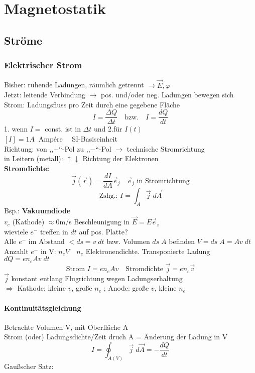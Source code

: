 \documentclass[titlepage,12pt,a4paper,ngerman]{report}
\newcommand{\tx}[1]{\textrm{#1}}
\begin{document}
\chapter{Magnetostatik}
\setcounter{section}{5}
\section{Ströme}
\subsection{Elektrischer Strom}
Bisher: ruhende Ladungen, räumlich getrennt $\rightarrow \vec{E}, \varphi$\\
Jetzt: leitende Verbindung $\rightarrow$ pos. und/oder neg. Ladungen bewegen sich\\
Strom: Ladungsfluss pro Zeit durch eine gegebene Fläche
$$\boxed{I= \frac{\Delta Q}{\Delta t}}\quad \tx{bzw.} \quad \boxed{I=\frac{dQ}{dt}}$$
1. wenn $I = $ const. ist in $\Delta t$ und 2.für $I(t)$\\
$[I] = 1 A \ \tx{ Ampére} \quad$ SI-Basiseinheit\\
Richtung: von ,,$+$``-Pol zu ,,$-$``-Pol $\rightarrow$ technische Stromrichtung\\
in Leitern (metall): $\uparrow \downarrow$ Richtung der Elektronen\\[10pt]
\textbf{Stromdichte:}
$$ \vec{j}(\vec{r}) = \frac{dI}{dA} \vec{e}_{j} \quad \vec{e}_{j} \tx{ in Stromrichtung}$$
$$\tx{Zshg.: } I = \int_A \vec{j} \; d\vec{A}$$
Bsp.: \textbf{Vakuumdiode}\\
$v_e$ (Kathode) $\approx 0 $m/s Beschleunigung in $\vec{E} = E \vec{e}_z$\\
wieviele $e^-$ treffen in $dt$ auf pos. Platte?\\
Alle $e^-$ im Abstand $< ds = v\; dt$ bzw. Volumen $ds\; A$ befinden $V = ds\; A = Av \; dt$ Anzahlt $e^-$ in V: $n_e V \quad n_e$ Elektronendichte. Transponierte Ladung $dQ = e n_e A v \; dt$
$$\tx{Strom } \boxed{I= e n_e A v} \quad \tx{Stromdichte } \boxed{\vec{j} = e n_e \vec{v}} $$
$\vec{j}$ konstant entlang Flugrichtung wegen Ladungserhaltung\\
$\Rightarrow$ Kathode: kleine $v$, große $n_e$ ; Anode: große $v$, kleine $n_e$
\subsubsection{Kontinuitätsgleichung}
Betrachte Volumen V, mit Oberfläche A\\
Strom (oder) Ladungsdichte/Zeit  druch A = Änderung der Ladung in V
$$I = \oint_{A(V)} \vec{j} \; d\vec{A} = -\frac{dQ}{dt}$$
Gaußscher Satz:
\end{document}
